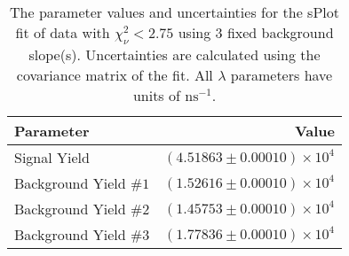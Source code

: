
\begin{table}
    \begin{center}
        \begin{tabular}{lr}\toprule
            Parameter & Value \\\midrule
            Signal Yield & $(4.51863 \pm 0.00010) \times 10^{4}$ \\
            Background Yield $\#1$ & $(1.52616 \pm 0.00010) \times 10^{4}$ \\
            Background Yield $\#2$ & $(1.45753 \pm 0.00010) \times 10^{4}$ \\
            Background Yield $\#3$ & $(1.77836 \pm 0.00010) \times 10^{4}$ \\\bottomrule
        \end{tabular}
        \caption{The parameter values and uncertainties for the sPlot fit of data with $\chi^2_\nu < 2.75$ using 3 fixed background slope(s). Uncertainties are calculated using the covariance matrix of the fit. All $\lambda$ parameters have units of $\si{\nano\second}^{-1}$.}
    \end{center}
\end{table}
